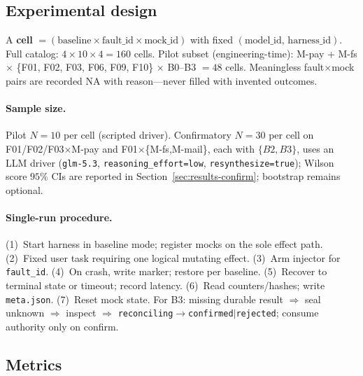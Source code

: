 \documentclass[11pt,a4paper]{article}
\begin{document}
\subsection{Experimental design}

A \textbf{cell} $= (\text{baseline} \times \text{fault\_id} \times
\text{mock\_id})$ with fixed $(\text{model\_id},\,\text{harness\_id})$.
Full catalog: $4 \times 10 \times 4 = 160$ cells. Pilot subset
(engineering-time): M-pay + M-fs $\times$ \{F01, F02, F03, F06, F09, F10\}
$\times$ B0--B3 $= 48$ cells. Meaningless fault$\times$mock pairs are
recorded NA with reason---never filled with invented outcomes.

\paragraph{Sample size.}
Pilot $N{=}10$ per cell (scripted driver). Confirmatory $N{=}30$ per cell
on F01/F02/F03$\times$M-pay and F01$\times$\{M-fs,M-mail\}, each with
$\{B2,B3\}$, uses an LLM driver (\texttt{glm-5.3},
\texttt{reasoning\_effort=low}, \texttt{resynthesize=true}); Wilson score
$95\%$ CIs are reported in Section~\ref{sec:results-confirm}; bootstrap remains
optional.

\paragraph{Single-run procedure.}
(1)~Start harness in baseline mode; register mocks on the sole effect path.
(2)~Fixed user task requiring one logical mutating effect.
(3)~Arm injector for \texttt{fault\_id}.
(4)~On crash, write marker; restore per baseline.
(5)~Recover to terminal state or timeout; record latency.
(6)~Read counters/hashes; write \texttt{meta.json}.
(7)~Reset mock state. For B3: missing durable result $\Rightarrow$ seal
unknown $\Rightarrow$ inspect $\Rightarrow$
\texttt{reconciling}$\to$\texttt{confirmed}$|$\texttt{rejected}; consume
authority only on confirm.

\subsection{Metrics}
\end{document}
